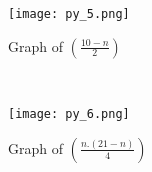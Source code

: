 \documentclass{article}
\begin{document}
\begin{figure}
    \centering
    \texttt{[image: py\_5.png]}
    \caption{Graph of $\left(\frac{10-n}{2}\right)$}
    \label{fig:enter-label}
\end{figure}\\\begin{figure}
    \centering
    \texttt{[image: py\_6.png]}
    \caption{Graph of $\left(\frac{n.(21-n)}{4}\right)$}
    \label{fig:enter-label}
\end{figure}
\end{document}
